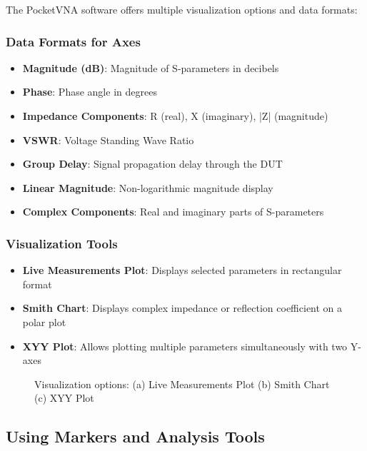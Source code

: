 \documentclass[12pt,a4paper]{article}
\begin{document}
The PocketVNA software offers multiple visualization options and data formats:

\subsubsection{Data Formats for Axes}

\begin{itemize}
    \item \textbf{Magnitude (dB)}: Magnitude of S-parameters in decibels
    \item \textbf{Phase}: Phase angle in degrees
    \item \textbf{Impedance Components}: R (real), X (imaginary), |Z| (magnitude)
    \item \textbf{VSWR}: Voltage Standing Wave Ratio
    \item \textbf{Group Delay}: Signal propagation delay through the DUT
    \item \textbf{Linear Magnitude}: Non-logarithmic magnitude display
    \item \textbf{Complex Components}: Real and imaginary parts of S-parameters
\end{itemize}

\subsubsection{Visualization Tools}

\begin{itemize}
    \item \textbf{Live Measurements Plot}: Displays selected parameters in rectangular format
    \item \textbf{Smith Chart}: Displays complex impedance or reflection coefficient on a polar plot
    \item \textbf{XYY Plot}: Allows plotting multiple parameters simultaneously with two Y-axes
\end{itemize}

\begin{figure}[H]
    \centering
    \caption{Visualization options: (a) Live Measurements Plot (b) Smith Chart (c) XYY Plot}
    \label{fig:viz_options}
\end{figure}

\subsection{Using Markers and Analysis Tools}
\end{document}
